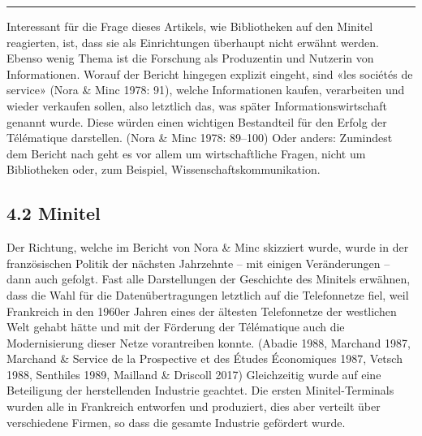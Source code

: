 \documentclass[a4paper,
fontsize=11pt,
oneside,
numbers=noperiodatend,
parskip=half-,
bibliography=totoc,
final
]{scrartcl}
\begin{document}
\begin{center}\rule{0.5\linewidth}{0.5pt}\end{center}

Interessant für die Frage dieses Artikels, wie Bibliotheken auf den
Minitel reagierten, ist, dass sie als Einrichtungen überhaupt nicht
erwähnt werden. Ebenso wenig Thema ist die Forschung als Produzentin und
Nutzerin von Informationen. Worauf der Bericht hingegen explizit
eingeht, sind «les sociétés de service» (Nora \& Minc 1978: 91), welche
Informationen kaufen, verarbeiten und wieder verkaufen sollen, also
letztlich das, was später Informationswirtschaft genannt wurde. Diese
würden einen wichtigen Bestandteil für den Erfolg der Télématique
darstellen. (Nora \& Minc 1978: 89--100) Oder anders: Zumindest dem
Bericht nach geht es vor allem um wirtschaftliche Fragen, nicht um
Bibliotheken oder, zum Beispiel, Wissenschaftskommunikation.

\hypertarget{minitel}{%
\subsection{4.2 Minitel}\label{minitel}}

Der Richtung, welche im Bericht von Nora \& Minc skizziert wurde, wurde
in der französischen Politik der nächsten Jahrzehnte -- mit einigen
Veränderungen -- dann auch gefolgt. Fast alle Darstellungen der
Geschichte des Minitels erwähnen, dass die Wahl für die
Datenübertragungen letztlich auf die Telefonnetze fiel, weil Frankreich
in den 1960er Jahren eines der ältesten Telefonnetze der westlichen Welt
gehabt hätte und mit der Förderung der Télématique auch die
Modernisierung dieser Netze vorantreiben konnte. (Abadie 1988, Marchand
1987, Marchand \& Service de la Prospective et des Études Économiques
1987, Vetsch 1988, Senthiles 1989, Mailland \& Driscoll 2017)
Gleichzeitig wurde auf eine Beteiligung der herstellenden Industrie
geachtet. Die ersten Minitel-Terminals wurden alle in Frankreich
entworfen und produziert, dies aber verteilt über verschiedene Firmen,
so dass die gesamte Industrie gefördert wurde.
\end{document}
